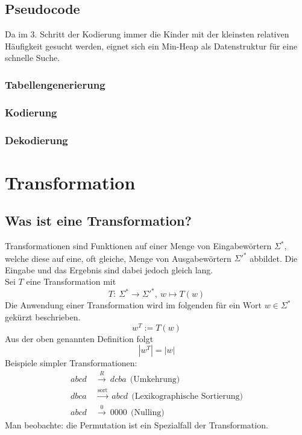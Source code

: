 \documentclass{article}
\begin{document}
\subsection{Pseudocode}
Da im 3. Schritt der Kodierung immer die Kinder mit der kleinsten relativen Häufigkeit
gesucht werden, eignet sich ein Min-Heap als Datenstruktur für eine schnelle Suche.
\subsubsection{Tabellengenerierung}

\newpage
\subsubsection{Kodierung}

\subsubsection{Dekodierung}


\newpage
\section{Transformation}
\subsection{Was ist eine Transformation?}
Transformationen sind Funktionen auf einer Menge von Eingabewörtern $\Sigma^*$, welche diese auf eine, oft gleiche, Menge von Ausgabewörtern $\Sigma'^{*}$ abbildet. Die Eingabe und das Ergebnis sind dabei jedoch gleich lang.
\\[.5cm]
Sei $T$ eine Transformation mit
\begin{equation}
    T:~\Sigma^*\rightarrow\Sigma'^*,~w\mapsto T(w)
\end{equation}
Die Anwendung einer Transformation wird im folgenden für ein Wort $w\in\Sigma^*$ gekürzt beschrieben.
\begin{equation}
    w^T:=T(w)
\end{equation}
Aus der oben genannten Definition folgt
\begin{equation}
    |w^T|=|w|
\end{equation}
Beispiele simpler Transformationen:
\begin{align*}
    abcd~&\stackrel{R}{\rightarrow}~dcba~~\text{(Umkehrung)}\\
    dbca~&\stackrel{\text{sort}}{\rightarrow}~abcd~~\text{(Lexikographische Sortierung)}\\
    abcd~&\stackrel{0}{\rightarrow}~0000~~\text{(Nulling)}
\end{align*}
Man beobachte: die Permutation ist ein Spezialfall der Transformation.
\end{document}
